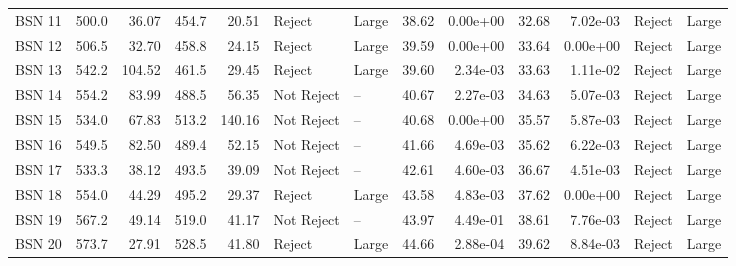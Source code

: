 \begin{tabular}{lrrrrllrrrrll}
 BSN 11 &              500.0 &   36.07 &               454.7 &   20.51 &      Reject &       Large &                    38.62 &  0.00e+00 &                     32.68 &  7.02e-03 &  Reject &       Large \\
 BSN 12 &              506.5 &   32.70 &               458.8 &   24.15 &      Reject &       Large &                    39.59 &  0.00e+00 &                     33.64 &  0.00e+00 &  Reject &       Large \\
 BSN 13 &              542.2 &  104.52 &               461.5 &   29.45 &      Reject &       Large &                    39.60 &  2.34e-03 &                     33.63 &  1.11e-02 &  Reject &       Large \\
 BSN 14 &              554.2 &   83.99 &               488.5 &   56.35 &  Not Reject &          -- &                    40.67 &  2.27e-03 &                     34.63 &  5.07e-03 &  Reject &       Large \\
 BSN 15 &              534.0 &   67.83 &               513.2 &  140.16 &  Not Reject &          -- &                    40.68 &  0.00e+00 &                     35.57 &  5.87e-03 &  Reject &       Large \\
 BSN 16 &              549.5 &   82.50 &               489.4 &   52.15 &  Not Reject &          -- &                    41.66 &  4.69e-03 &                     35.62 &  6.22e-03 &  Reject &       Large \\
 BSN 17 &              533.3 &   38.12 &               493.5 &   39.09 &  Not Reject &          -- &                    42.61 &  4.60e-03 &                     36.67 &  4.51e-03 &  Reject &       Large \\
 BSN 18 &              554.0 &   44.29 &               495.2 &   29.37 &      Reject &       Large &                    43.58 &  4.83e-03 &                     37.62 &  0.00e+00 &  Reject &       Large \\
 BSN 19 &              567.2 &   49.14 &               519.0 &   41.17 &  Not Reject &          -- &                    43.97 &  4.49e-01 &                     38.61 &  7.76e-03 &  Reject &       Large \\
 BSN 20 &              573.7 &   27.91 &               528.5 &   41.80 &      Reject &       Large &                    44.66 &  2.88e-04 &                     39.62 &  8.84e-03 &  Reject &       Large \\
\bottomrule
\end{tabular}
